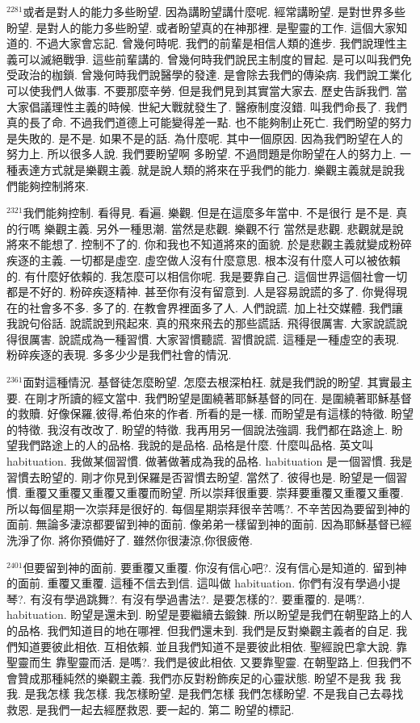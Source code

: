 \documentclass{book}
\begin{document}
$^{2281}$或者是對人的能力多些盼望.
因為講盼望講什麼呢.
經常講盼望.
是對世界多些盼望.
是對人的能力多些盼望.
或者盼望真的在神那裡.
是聖靈的工作.
這個大家知道的.
不過大家會忘記.
曾幾何時呢.
我們的前輩是相信人類的進步.
我們說理性主義可以滅絕戰爭.
這些前輩講的.
曾幾何時我們說民主制度的冒起.
是可以叫我們免受政治的枷鎖.
曾幾何時我們說醫學的發達.
是會除去我們的傳染病.
我們說工業化可以使我們人做事.
不要那麼辛勞.
但是我們見到其實當大家去.
歷史告訴我們.
當大家倡議理性主義的時候.
世紀大戰就發生了.
醫療制度沒錯.
叫我們命長了.
我們真的長了命.
不過我們道德上可能變得差一點.
也不能夠制止死亡.
我們盼望的努力是失敗的.
是不是.
如果不是的話.
為什麼呢.
其中一個原因.
因為我們盼望在人的努力上.
所以很多人說.
我們要盼望啊 多盼望.
不過問題是你盼望在人的努力上.
一種表達方式就是樂觀主義.
就是說人類的將來在乎我們的能力.
樂觀主義就是說我們能夠控制將來.

$^{2321}$我們能夠控制.
看得見.
看遍.
樂觀.
但是在這麼多年當中.
不是很行 是不是.
真的行嗎 樂觀主義.
另外一種思潮.
當然是悲觀.
樂觀不行 當然是悲觀.
悲觀就是說將來不能想了.
控制不了的.
你和我也不知道將來的面貌.
於是悲觀主義就變成粉碎疾逐的主義.
一切都是虛空.
虛空做人沒有什麼意思.
根本沒有什麼人可以被依賴的.
有什麼好依賴的.
我怎麼可以相信你呢.
我是要靠自己.
這個世界這個社會一切都是不好的.
粉碎疾逐精神.
甚至你有沒有留意到.
人是容易說謊的多了.
你覺得現在的社會多不多.
多了的.
在教會界裡面多了人.
人們說謊.
加上社交媒體.
我們讓我說句俗話.
說謊說到飛起來.
真的飛來飛去的那些謊話.
飛得很厲害.
大家說謊說得很厲害.
說謊成為一種習慣.
大家習慣聽謊.
習慣說謊.
這種是一種虛空的表現.
粉碎疾逐的表現.
多多少少是我們社會的情況.

$^{2361}$面對這種情況.
基督徒怎麼盼望.
怎麼去根深柏枉.
就是我們說的盼望.
其實最主要.
在剛才所讀的經文當中.
我們盼望是圍繞著耶穌基督的同在.
是圍繞著耶穌基督的救贖.
好像保羅,彼得,希伯來的作者.
所看的是一樣.
而盼望是有這樣的特徵.
盼望的特徵.
我沒有改改了.
盼望的特徵.
我再用另一個說法強調.
我們都在路途上.
盼望我們路途上的人的品格.
我說的是品格.
品格是什麼.
什麼叫品格.
英文叫habituation.
我做某個習慣.
做著做著成為我的品格.
habituation 是一個習慣.
我是習慣去盼望的.
剛才你見到保羅是否習慣去盼望.
當然了.
彼得也是.
盼望是一個習慣.
重覆又重覆又重覆又重覆而盼望.
所以崇拜很重要.
崇拜要重覆又重覆又重覆.
所以每個星期一次崇拜是很好的.
每個星期崇拜很辛苦嗎?.
不辛苦因為要留到神的面前.
無論多淒涼都要留到神的面前.
像弟弟一樣留到神的面前.
因為耶穌基督已經洗淨了你.
將你預備好了.
雖然你很淒涼,你很疲倦.

$^{2401}$但要留到神的面前.
要重覆又重覆.
你沒有信心吧?.
沒有信心是知道的.
留到神的面前.
重覆又重覆.
這種不信去到信.
這叫做 habituation.
你們有沒有學過小提琴?.
有沒有學過跳舞?.
有沒有學過書法?.
是要怎樣的?.
要重覆的.
是嗎?.
habituation.
盼望是還未到.
盼望是要繼續去鍛鍊.
所以盼望是我們在朝聖路上的人的品格.
我們知道目的地在哪裡.
但我們還未到.
我們是反對樂觀主義者的自足.
我們知道要彼此相依.
互相依賴.
並且我們知道不是要彼此相依.
聖經說巴拿大說.
靠聖靈而生 靠聖靈而活.
是嗎?.
我們是彼此相依.
又要靠聖靈.
在朝聖路上.
但我們不會贊成那種純然的樂觀主義.
我們亦反對粉飾疾足的心靈狀態.
盼望不是我 我 我 我.
是我怎樣 我怎樣.
我怎樣盼望.
是我們怎樣 我們怎樣盼望.
不是我自己去尋找救恩.
是我們一起去經歷救恩.
要一起的.
第二 盼望的標記.
\end{document}
